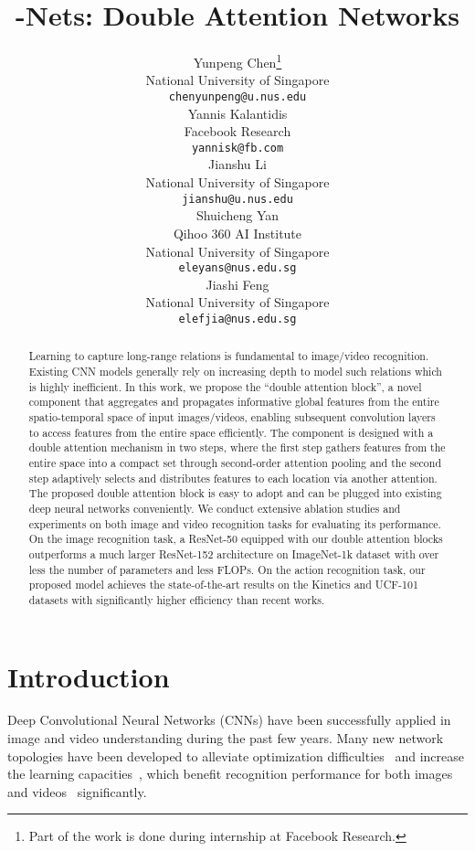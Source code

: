 \documentclass{article}
\title{-Nets: Double Attention Networks}
\author{
  Yunpeng Chen\thanks{Part of the work is done during internship at Facebook Research.} \\
  National University of Singapore\\
  \texttt{chenyunpeng@u.nus.edu} \\
  \And
  Yannis Kalantidis \\
  Facebook Research\\
  \texttt{yannisk@fb.com} \\
  \And
  Jianshu Li \\
  National University of Singapore\\
  \texttt{jianshu@u.nus.edu} \\
  \And
  Shuicheng Yan \\
  Qihoo 360 AI Institute \\
  National University of Singapore\\
  \texttt{eleyans@nus.edu.sg} \\
  \And
  Jiashi Feng \\
  National University of Singapore\\
  \texttt{elefjia@nus.edu.sg} \\
}
\begin{document}
\maketitle

\begin{abstract}
Learning to capture long-range relations is fundamental to image/video recognition. Existing CNN models generally rely on increasing depth to model such relations which is highly inefficient. In this work, we propose the ``double attention block'', a novel component that aggregates and propagates informative global features from the entire spatio-temporal space of input images/videos, enabling  subsequent convolution layers to access features from the entire space efficiently. The component is designed with a double attention mechanism in two steps, where the first step gathers features from the entire space into a compact set through second-order attention pooling and the second step adaptively selects and distributes features to each location via another attention. The proposed double attention block is easy to adopt and can be plugged into existing deep neural networks conveniently. We conduct extensive ablation studies and experiments on both image and video recognition tasks for evaluating its performance. On the image recognition task, a ResNet-50 equipped with our double attention blocks outperforms a much larger ResNet-152 architecture on ImageNet-1k dataset with over  less the number of parameters and less FLOPs. On the action recognition task, our proposed model achieves the state-of-the-art results on the Kinetics and UCF-101 datasets with significantly higher efficiency than recent works. 
\end{abstract}
 
\section{Introduction}
\label{sec:intro}

Deep Convolutional Neural Networks (CNNs) have been successfully applied in image and video understanding during the past few years. 
Many new network topologies have been developed to alleviate optimization difficulties~\cite{he2016deep,he2016identity} and increase the learning capacities~\cite{xie2017aggregated,chen2017dual}, which benefit recognition performance for both images~\cite{girshick2015fast,chen2016deeplab} and videos~\cite{tran2017closer} significantly.
\end{document}
